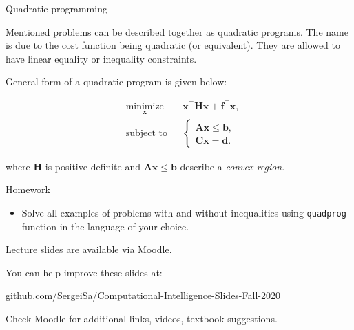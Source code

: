 \documentclass{beamer}
\begin{document}
\begin{frame}{Quadratic programming}
\begin{flushleft}

Mentioned problems can be described together as quadratic programs. The name is due to the cost function being quadratic (or equivalent). They are allowed to have linear equality or inequality constraints. 

\bigskip

General form of a quadratic program is given below:

%
\begin{equation}
\begin{aligned}
& \underset{\mathbf{x}}{\text{minimize}}
& & \mathbf{x}^\top \mathbf{H} \mathbf{x} + \mathbf{f}^\top\mathbf{x}, \\
& \text{subject to}
& & \begin{cases}
    \mathbf{A}\mathbf{x} \leq \mathbf{b}, \\
    \mathbf{C}\mathbf{x} = \mathbf{d}.
    \end{cases}
\end{aligned}
\end{equation}

where $\mathbf{H}$ is positive-definite and $\mathbf{A}\mathbf{x} \leq \mathbf{b}$ describe a \emph{convex region}.

\end{flushleft}
\end{frame}



\begin{frame}{Homework}
\begin{flushleft}

\begin{itemize}
    \item Solve all examples of problems with and without inequalities using \texttt{quadprog} function in the language of your choice.
\end{itemize}

\end{flushleft}
\end{frame}




\begin{frame}
\centerline{Lecture slides are available via Moodle.}
\bigskip
\centerline{You can help improve these slides at:}

\centerline{\href{https://github.com/SergeiSa/Computational-Intelligence-Slides-Fall-2020}{github.com/SergeiSa/Computational-Intelligence-Slides-Fall-2020}}


\bigskip
\centerline{Check Moodle for additional links, videos, textbook suggestions.}
\end{frame}
\end{document}
